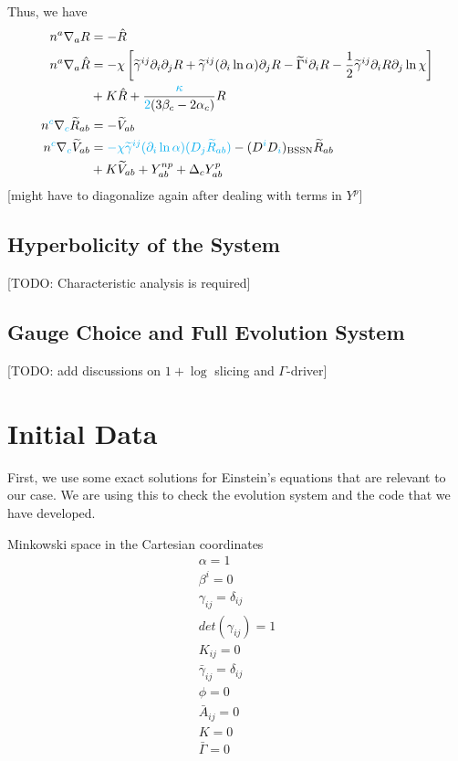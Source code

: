 \documentclass[a4paper,oneside,openany,11pt]{memoir}
\numberwithin{equation}{section} %
\newcommand{\aaron}[1]{{\color{cyan} #1}}
\newcommand{\TODO}[1]{{\color{red}[}{\color{red}TODO:} {\color{blue}#1}{\color{red}]}}
\begin{document}
Thus, we have
\begin{align}
n^a \nabla_a R &= - \hat{R}  \\
n^a \nabla_a \hat{R} &= -
\chi \left[\widetilde{\gamma}^{ij} \partial_i \partial_j R + \widetilde{\gamma}^{ij} (\partial_i  \ln \alpha) \partial_j R - \widetilde{\Gamma}^i \partial_i R - \frac{1}{2} \widetilde{\gamma}^{ij} \partial_i R \partial_j \ln \chi \right] \nonumber \\
& + K \hat{R} + \frac{\aaron{\kappa}}{\aaron{2} (3\beta_c - 2 \alpha_c)} R\\
n^\aaron{c} \nabla_\aaron{c} \widetilde{R}_{ab} &= - \widetilde{V}_{ab}  \\
n^\aaron{c} \nabla_\aaron{c} \widetilde{V}_{ab} &= 
\aaron{- \chi\widetilde{\gamma}^{ij}(\partial_i\ln\alpha) (D_j \widetilde{R}_{ab})}
- (D^\aaron{i} D_\aaron{i} )_{\textrm{BSSN}} \widetilde{R}_{ab} \nonumber \\
& + K \widetilde{V}_{ab} + Y^{np}_{ab} + \Delta_c Y^{p}_{ab}
\end{align}
\aaron{[might have to diagonalize again after dealing with terms in $Y^{p}$]}


\subsection{Hyperbolicity of the System}
\TODO{Characteristic analysis is required}

\subsection{Gauge Choice and Full Evolution System}
\TODO{add discussions on $1+\log$ slicing and $\Gamma$-driver}


\section{Initial Data}

First, we use some exact solutions for Einstein's equations 
that are relevant to our case. We are using this to check 
the evolution system and the code that we have developed.

Minkowski space in the Cartesian coordinates
\begin{align}
\label{eqn:id:mink}
\alpha = 1 \\
\beta^i = 0 \\
\gamma_{ij} = \delta_{ij} \\
det(\gamma_{ij}) = 1  \\
K_{ij} = 0 \\
\bar{\gamma}_{ij} = \delta_{ij} \\
\phi = 0 \\
\bar{A}_{ij} = 0 \\
K = 0 \\
\bar{\Gamma} = 0
\end{align}
\end{document}

